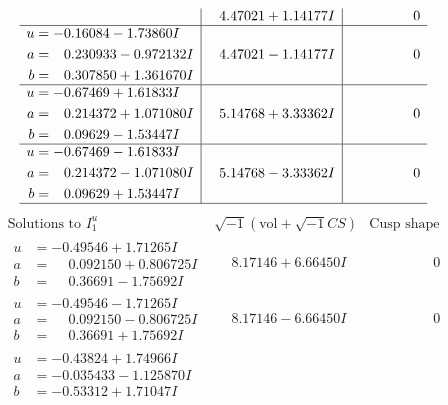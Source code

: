 \documentclass[1p]{elsarticle_modified}
\theoremstyle{definition}
\newcommand{\I}{\sqrt{-1}}
\begin{document}
$$\begin{array}{c|c|c}
 & \phantom{-}4.47021 + 1.14177 I & \phantom{-0.000000 } 0 \\ \hline\begin{aligned}
u &= -0.16084 - 1.73860 I \\
a &= \phantom{-}0.230933 - 0.972132 I \\
b &= \phantom{-}0.307850 + 1.361670 I\end{aligned}
 & \phantom{-}4.47021 - 1.14177 I & \phantom{-0.000000 } 0 \\ \hline\begin{aligned}
u &= -0.67469 + 1.61833 I \\
a &= \phantom{-}0.214372 + 1.071080 I \\
b &= \phantom{-}0.09629 - 1.53447 I\end{aligned}
 & \phantom{-}5.14768 + 3.33362 I & \phantom{-0.000000 } 0 \\ \hline\begin{aligned}
u &= -0.67469 - 1.61833 I \\
a &= \phantom{-}0.214372 - 1.071080 I \\
b &= \phantom{-}0.09629 + 1.53447 I\end{aligned}
 & \phantom{-}5.14768 - 3.33362 I & \phantom{-0.000000 } 0\\
 \hline 
 \end{array}$$\newpage$$\begin{array}{c|c|c}  
\text{Solutions to }I^u_{1}& \I (\text{vol} + \sqrt{-1}CS) & \text{Cusp shape}\\
 \hline 
\begin{aligned}
u &= -0.49546 + 1.71265 I \\
a &= \phantom{-}0.092150 + 0.806725 I \\
b &= \phantom{-}0.36691 - 1.75692 I\end{aligned}
 & \phantom{-}8.17146 + 6.66450 I & \phantom{-0.000000 } 0 \\ \hline\begin{aligned}
u &= -0.49546 - 1.71265 I \\
a &= \phantom{-}0.092150 - 0.806725 I \\
b &= \phantom{-}0.36691 + 1.75692 I\end{aligned}
 & \phantom{-}8.17146 - 6.66450 I & \phantom{-0.000000 } 0 \\ \hline\begin{aligned}
u &= -0.43824 + 1.74966 I \\
a &= -0.035433 - 1.125870 I \\
b &= -0.53312 + 1.71047 I\end{aligned}

\end{array}$$
\end{document}
